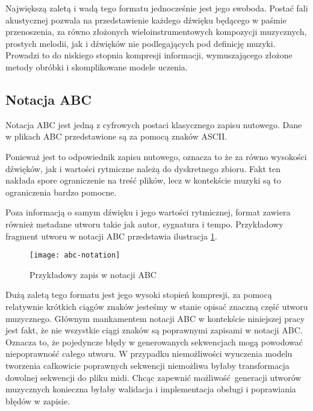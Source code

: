 {{{            Największą zaletą i wadą tego formatu jednocześnie jest jego swoboda. 
            Postać fali akustycznej pozwala na przedstawienie każdego dźwięku będącego w paśmie
            przenoszenia, za równo złożonych wieloinstrumentowych kompozycji muzycznych, 
            prostych melodii, jak i dźwięków nie podlegających pod definicję muzyki. 
            Prowadzi to do niskiego stopnia kompresji informacji, wymuszającego złożone metody obróbki i skomplikowane
            modele uczenia.
        }

        \subsection{Notacja ABC}
        {
            Notacja ABC jest jedną z cyfrowych postaci klasycznego zapisu nutowego.
            Dane w plikach ABC przedstawione są za pomocą znaków ASCII.

            Ponieważ jest to odpowiednik zapisu nutowego, oznacza to
            że za równo wysokości dźwięków, jak i wartości rytmiczne należą do dyskretnego zbioru.
            Fakt ten nakłada spore ograniczenie na treść plików, lecz w kontekście muzyki są to 
            ograniczenia bardzo pomocne.

            Poza informacją o samym dźwięku i jego wartości rytmicznej, format zawiera również metadane
            utworu takie jak autor, sygnatura i tempo. Przykładowy fragment utworu w notacji ABC przedstawia
            ilustracja \ref{abcnotation}.

            \begin{figure}
                \centering
                \texttt{[image: abc-notation]}
                \caption{Przykładowy zapis w notacji ABC}
                \label{abcnotation}
            \end{figure}

            Dużą zaletą tego formatu jest jego wysoki stopień kompresji, za pomocą relatywnie krótkich ciągów
            znaków jesteśmy w stanie opisać znaczną część utworu muzycznego. Głównym mankamentem notacji ABC
            w kontekście niniejszej pracy jest fakt, że nie wszystkie ciągi znaków są poprawnymi zapisami 
            w notacji ABC. Oznacza to, że pojedyncze błędy w generowanych sekwencjach mogą powodować niepoprawność całego utworu.
            W przypadku niemożliwości wyuczenia modelu tworzenia całkowicie poprawnych sekwencji niemożliwa byłaby
            transformacja dowolnej sekwencji do pliku midi. Chcąc zapewnić możliwość generacji utworów muzycznych
            konieczna byłaby walidacja i implementacja obsługi i poprawiania błędów w zapisie.
        }

}}
